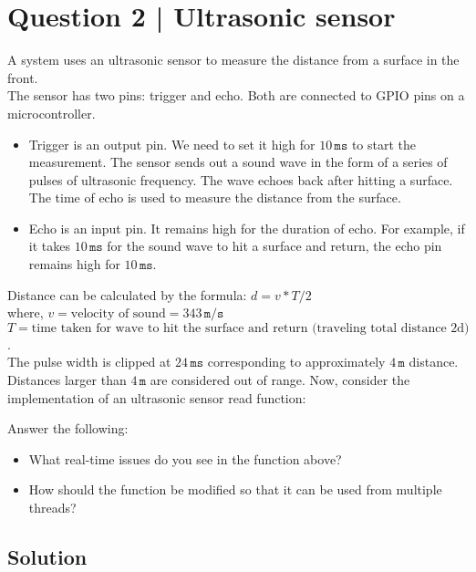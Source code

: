 \section*{Question 2 | Ultrasonic sensor}

A system uses an ultrasonic sensor to measure the distance from a surface in the front. \\
The sensor has two pins: trigger and echo.
Both are connected to GPIO pins on a microcontroller.
\begin{itemize}[noitemsep, topsep=0pt, leftmargin=*]
    \item
          Trigger is an output pin.
          We need to set it high for \( 10 \, \texttt{ms} \) to start the measurement.
          The sensor sends out a sound wave in the form of a series of pulses of ultrasonic frequency.
          The wave echoes back after hitting a surface.
          The time of echo is used to measure the distance from the surface.
    \item
          Echo is an input pin.
          It remains high for the duration of echo.
          For example, if it takes \( 10 \, \texttt{ms} \) for the sound wave to hit a surface and return, the echo pin remains high for \( 10 \, \texttt{ms} \).
\end{itemize}
Distance can be calculated by the formula: \( d = v * T / 2 \) \\
where, \( v = \text{velocity of sound} = 343 \, \texttt{m/s} \) \\
\( T = \text{time taken for wave to hit the surface and return (traveling total distance 2d)} \). \\
The pulse width is clipped at \( 24 \, \texttt{ms} \) corresponding to approximately \( 4 \, \texttt{m} \) distance.
Distances larger than \( 4 \, \texttt{m} \) are considered out of range.
Now, consider the implementation of an ultrasonic sensor read function:

Answer the following:
\begin{itemize}[noitemsep, topsep=0pt]
    \item What real-time issues do you see in the function above?
    \item How should the function be modified so that it can be used from multiple threads?
\end{itemize}

\vspace*{-1em}
\subsection*{Solution}
